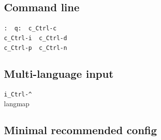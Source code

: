 \documentclass[14pt,svgnames,compress]{beamer}
\newcommand\hl[1]{\textcolor{HlColor}{#1}}
\newcommand\framesubtitlefontsize{\huge}
\newcommand\singleframesubtitle[1]{
    \begin{center}
        \framesubtitlefontsize #1
    \end{center}
}
\newcommand\subtitleframe{
    \begin{frame}
        \singleframesubtitle{\insertsubsectionhead}
    \end{frame}
}
\begin{document}
\subsection{Command line}

\subtitleframe

\begin{frame}[fragile]
    \begin{spacing}{1.5} %
        \Large
        \centering
        \verb|:  q:  c_Ctrl-c| \\ \bigskip
        \verb|c_Ctrl-i  c_Ctrl-d| \\ \bigskip
        \verb|c_Ctrl-p  c_Ctrl-n|
    \end{spacing}
\end{frame}


\subsection{Multi-language input}

\subtitleframe

\begin{frame}[fragile]
    \Large
    \centering
    \verb|i_Ctrl-^| \\
    \vspace{1cm}
    \hl{langmap} \\
\end{frame}


\subsection{Minimal recommended config}

\subtitleframe
\end{document}

